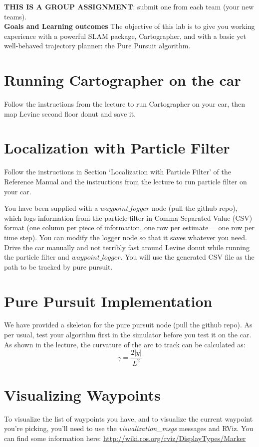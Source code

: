 \documentclass[letta4 paper]{article}
\begin{document}

\textbf{THIS IS A GROUP ASSIGNMENT}: submit one from each team (your new teams).\\

\noindent \textbf{Goals and Learning outcomes}
The objective of this lab is to give you working experience with a powerful SLAM package, Cartographer, and with a basic yet well-behaved trajectory planner: the Pure Pursuit algorithm.


\section{Running Cartographer on the car}
Follow the instructions from the lecture to run Cartographer on your car, then map Levine second floor donut and save it.


\section{Localization with Particle Filter}
Follow the instructions in Section `Localization with Particle Filter' of the Reference Manual and the instructions from the lecture to run particle filter on your car.


\noindent You have been supplied with a $\textit{waypoint\_logger}$ node (pull the github repo), which logs information from the particle filter in Comma Separated Value (CSV) format (one column per piece of information, one row per estimate = one row per time step). You can modify the logger node so that it saves whatever you need. Drive the car manually and not terribly fast around Levine donut while running the particle filter and $\textit{waypoint\_logger}$. You will use the generated CSV file as the path to be tracked by pure pursuit.


\section{Pure Pursuit Implementation}
We have provided a skeleton for the pure pursuit node (pull the github repo). As per usual, test your algorithm first in the simulator before you test it on the car. As shown in the lecture, the curvature of the arc to track can be calculated as:
\begin{equation}
    \gamma = \frac{2|y|}{L^2}
\end{equation}


\section{Visualizing Waypoints}
To visualize the list of waypoints you have, and to visualize the current waypoint you're picking, you'll need to use the \textit{visualization\_msgs} messages and RViz. You can find some information here: \href{http://wiki.ros.org/rviz/DisplayTypes/Marker}{http://wiki.ros.org/rviz/DisplayTypes/Marker}
\end{document}
